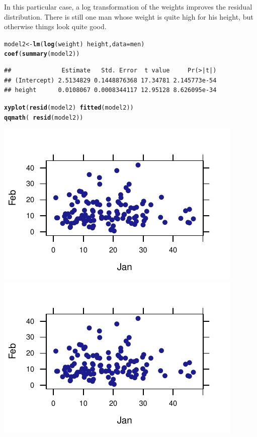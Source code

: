 \documentclass[twoside]{book}
\makeatletter
\def\maxwidth{ %
  \ifdim\Gin@nat@width>\linewidth
    \linewidth
  \else
    \Gin@nat@width
  \fi
}
\newcommand{\hlopt}[1]{\textcolor[rgb]{0,0,0}{#1}}%
\newcommand{\hlstd}[1]{\textcolor[rgb]{0.345,0.345,0.345}{#1}}%
\newcommand{\hlkwb}[1]{\textcolor[rgb]{0.69,0.353,0.396}{#1}}%
\newcommand{\hlkwc}[1]{\textcolor[rgb]{0.333,0.667,0.333}{#1}}%
\newcommand{\hlkwd}[1]{\textcolor[rgb]{0.737,0.353,0.396}{\textbf{#1}}}%
\newenvironment{kframe}{%
 \def\at@end@of@kframe{}%
 \ifinner\ifhmode%
  \def\at@end@of@kframe{\end{minipage}}%
  \begin{minipage}{\columnwidth}%
 \fi\fi%
 \def\FrameCommand##1{\hskip\@totalleftmargin \hskip-\fboxsep
 \colorbox{shadecolor}{##1}\hskip-\fboxsep
     \hskip-\linewidth \hskip-\@totalleftmargin \hskip\columnwidth}%
 \MakeFramed {\advance\hsize-\width
   \@totalleftmargin\z@ \linewidth\hsize
   \@setminipage}}%
 {\par\unskip\endMakeFramed%
 \at@end@of@kframe}
\newenvironment{knitrout}{}{} %
\makeatother
\begin{document}
\begin{solution}
\begin{enumerate}
In this particular case, a log transformation of the weights improves the
residual distribution.  There is still one man whose weight is quite high for
his height, but otherwise things look quite good.
\begin{knitrout}
\color{fgcolor}\begin{kframe}
\begin{alltt}
\hlstd{model2} \hlkwb{<-} \hlkwd{lm}\hlstd{(}\hlkwd{log}\hlstd{(weight)} \hlopt{~} \hlstd{height,} \hlkwc{data} \hlstd{= men)}
\hlkwd{coef}\hlstd{(}\hlkwd{summary}\hlstd{(model2))}
\end{alltt}
\begin{verbatim}
##              Estimate   Std. Error  t value     Pr(>|t|)
## (Intercept) 2.5134829 0.1448876368 17.34781 2.145773e-54
## height      0.0108067 0.0008344117 12.95128 8.626095e-34
\end{verbatim}
\begin{alltt}
\hlkwd{xyplot}\hlstd{(}\hlkwd{resid}\hlstd{(model2)} \hlopt{~} \hlkwd{fitted}\hlstd{(model2))}
\hlkwd{qqmath}\hlstd{(}\hlopt{~}\hlkwd{resid}\hlstd{(model2))}
\end{alltt}
\end{kframe}

{\centering \includegraphics[width=\maxwidth]{figures/fig-unnamed-chunk-39-1} 
\includegraphics[width=\maxwidth]{figures/fig-unnamed-chunk-39-2} 

}
\end{knitrout}
\end{enumerate}
\end{solution}
\end{document}

